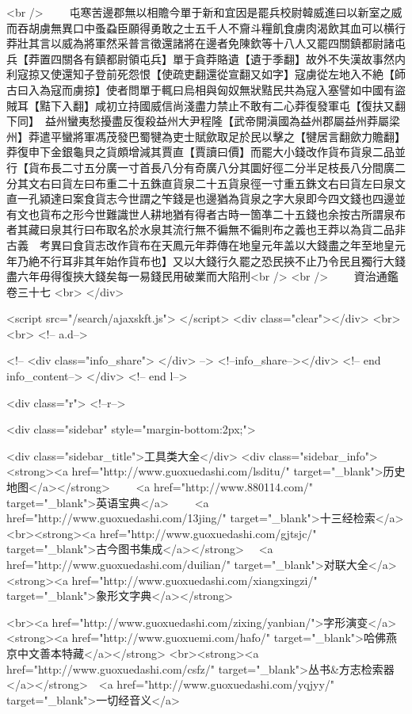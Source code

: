 <br />
　　屯寒苦邊郡無以相贍今單于新和宜因是罷兵校尉韓威進曰以新室之威而吞胡虜無異口中蚤蝨臣願得勇敢之士五千人不齎斗糧飢食虜肉渴飲其血可以横行莽壯其言以威為將軍然采普言徵還諸將在邊者免陳欽等十八人又罷四關鎮都尉諸屯兵【莽置四關各有鎮都尉領屯兵】單于貪莽賂遺【遺于季翻】故外不失漢故事然内利寇掠又使還知子登前死怨恨【使疏吏翻還從宣翻又如字】寇虜從左地入不絶【師古曰入為寇而虜掠】使者問單于輒曰烏相與匈奴無狀黠民共為寇入塞譬如中國有盜賊耳【黠下入翻】咸初立持國威信尚淺盡力禁止不敢有二心莽復發軍屯【復扶又翻下同】　益州蠻夷愁擾盡反復殺益州大尹程隆【武帝開滇國為益州郡屬益州莽屬梁州】莽遣平蠻將軍馮茂發巴蜀犍為吏士賦歛取足於民以擊之【犍居言翻歛力贍翻】　莽復申下金銀龜貝之貨頗增減其賈直【賈讀曰價】而罷大小錢改作貨布貨泉二品並行【貨布長二寸五分廣一寸首長八分有奇廣八分其圜好徑二分半足枝長八分間廣二分其文右曰貨左曰布重二十五銖直貨泉二十五貨泉徑一寸重五銖文右曰貨左曰泉文直一孔潁達曰案食貨志今世謂之笇錢是也邊猶為貨泉之字大泉即今四文錢也四邊並有文也貨布之形今世難識世人耕地猶有得者古時一箇凖二十五錢也余按古所謂泉布者其藏曰泉其行曰布取名於水泉其流行無不徧無不徧則布之義也王莽以為貨二品非古義　考異曰食貨志改作貨布在天鳳元年莽傳在地皇元年盖以大錢盡之年至地皇元年乃絶不行耳非其年始作貨布也】又以大錢行久罷之恐民挾不止乃令民且獨行大錢盡六年毋得復挾大錢矣每一易錢民用破業而大陷刑<br />
<br />
　　資治通鑑卷三十七  <br>
   </div> 

<script src="/search/ajaxskft.js"> </script>
 <div class="clear"></div>
<br>
<br>
 <!-- a.d-->

 <!--
<div class="info_share">
</div> 
-->
 <!--info_share--></div>   <!-- end info_content-->
  </div> <!-- end l-->

<div class="r">   <!--r-->



<div class="sidebar"  style="margin-bottom:2px;">

 
<div class="sidebar_title">工具类大全</div>
<div class="sidebar_info">
<strong><a href="http://www.guoxuedashi.com/lsditu/" target="_blank">历史地图</a></strong>　　
<a href="http://www.880114.com/" target="_blank">英语宝典</a>　　
<a href="http://www.guoxuedashi.com/13jing/" target="_blank">十三经检索</a>　
<br><strong><a href="http://www.guoxuedashi.com/gjtsjc/" target="_blank">古今图书集成</a></strong>　
<a href="http://www.guoxuedashi.com/duilian/" target="_blank">对联大全</a>　<strong><a href="http://www.guoxuedashi.com/xiangxingzi/" target="_blank">象形文字典</a></strong>　

<br><a href="http://www.guoxuedashi.com/zixing/yanbian/">字形演变</a>　　<strong><a href="http://www.guoxuemi.com/hafo/" target="_blank">哈佛燕京中文善本特藏</a></strong>
<br><strong><a href="http://www.guoxuedashi.com/csfz/" target="_blank">丛书&方志检索器</a></strong>　<a href="http://www.guoxuedashi.com/yqjyy/" target="_blank">一切经音义</a>　　

